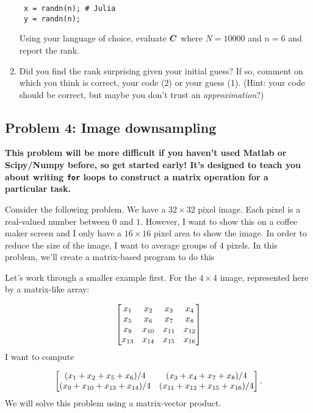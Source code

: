 \documentclass{article}
\begin{document}
\begin{enumerate}
\begin{verbatim} x = randn(n); # Julia
 y = randn(n); \end{verbatim}
Using your language of choice, evaluate $\boldsymbol{C}$ where $N = 10000$ and $n=6$ and report the rank.


\item Did you find the rank surprising given your initial guess? If so, comment on which you think is correct, your code (2) or your guess (1). (Hint: your code should be correct, but maybe you don'{}t trust an \emph{approximation}?)



\end{enumerate}
\hypertarget{problem_4_image_downsampling_6}{}\subsection*{{Problem 4: Image downsampling}}\label{problem_4_image_downsampling_6}

\textbf{This problem will be more difficult if you haven'{}t used Matlab or Scipy/Numpy before, so get started early! It'{}s designed to teach you about writing {\colorbox[rgb]{1.00,0.93,1.00}{\tt for}} loops to construct a matrix operation for a particular task.}

Consider the following problem. We have a $32 \times 32$ pixel image. Each pixel is a real-valued number between $0$ and $1$. However, I want to show this on a coffee maker screen and I only have a $16 \times 16$ pixel area to show the image. In order to reduce the size of the image, I want to average groups of 4 pixels. In this problem, we'{}ll create a matrix-based program to do this

Let'{}s work through a smaller example first. For the $4 \times 4$ image, represented here by a matrix-like array:

\begin{displaymath}
\begin{bmatrix}  x_{1} & x_2 & x_3 & x_4 \\          x_5 & x_6 & x_7 & x_8 \\
          x_9 & x_{10} & x_{11} & x_{12} \\
          x_{13} & x_{14} & x_{15} & x_{16}  \end{bmatrix}
\end{displaymath}
I want to compute

\begin{displaymath}
\begin{bmatrix}  (x_1 + x_2 + x_5 + x_6)/4 & (x_3 + x_4 + x_7 + x_8)/4 \\   (x_9 + x_{10} + x_{13} + x_{14})/4 & (x_{11} + x_{12} + x_{15} + x_{16})/4  \end{bmatrix}.
\end{displaymath}
We will solve this problem using a matrix-vector product.
\end{document}

